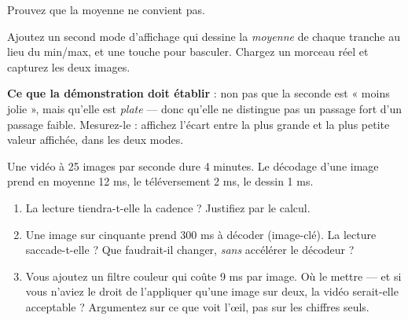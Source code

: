 \begin{nkdemo}
Prouvez que la moyenne ne convient pas.

Ajoutez un second mode d'affichage qui dessine la \emph{moyenne} de chaque
tranche au lieu du min/max, et une touche pour basculer. Chargez un morceau réel
et capturez les deux images.

\textbf{Ce que la démonstration doit établir} : non pas que la seconde est
« moins jolie », mais qu'elle est \emph{plate} --- donc qu'elle ne distingue pas
un passage fort d'un passage faible. Mesurez-le : affichez l'écart entre la plus
grande et la plus petite valeur affichée, dans les deux modes.
\end{nkdemo}

\begin{nklogique}
Une vidéo à 25 images par seconde dure 4 minutes. Le décodage d'une image prend
en moyenne 12 ms, le téléversement 2 ms, le dessin 1 ms.

\begin{enumerate}
\item La lecture tiendra-t-elle la cadence ? Justifiez par le calcul.
\item Une image sur cinquante prend 300 ms à décoder (image-clé). La lecture
      saccade-t-elle ? Que faudrait-il changer, \emph{sans} accélérer le
      décodeur ?
\item Vous ajoutez un filtre couleur qui coûte 9 ms par image. Où le mettre ---
      et si vous n'aviez le droit de l'appliquer qu'une image sur deux, la vidéo
      serait-elle acceptable ? Argumentez sur ce que voit l'\oe il, pas sur les
      chiffres seuls.
\end{enumerate}
\end{nklogique}
